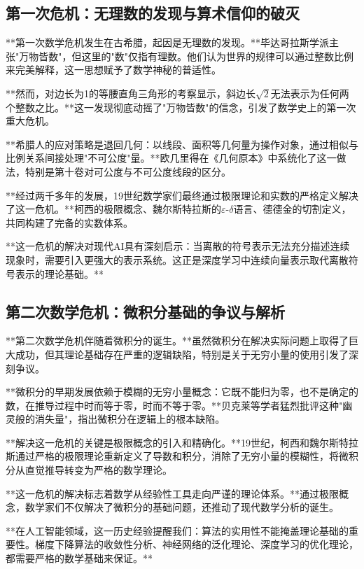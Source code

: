 \subsection{第一次危机：无理数的发现与算术信仰的破灭}

**第一次数学危机发生在古希腊，起因是无理数的发现。**毕达哥拉斯学派主张"万物皆数"，但这里的"数"仅指有理数。他们认为世界的规律可以通过整数比例来完美解释，这一思想赋予了数学神秘的普适性。

**然而，对边长为1的等腰直角三角形的考察显示，斜边长$\sqrt{2}$无法表示为任何两个整数之比。**这一发现彻底动摇了"万物皆数"的信念，引发了数学史上的第一次重大危机。

**希腊人的应对策略是退回几何：以线段、面积等几何量为操作对象，通过相似与比例关系间接处理"不可公度"量。**欧几里得在《几何原本》中系统化了这一做法，特别是第十卷对可公度与不可公度线段的区分。

**经过两千多年的发展，19世纪数学家们最终通过极限理论和实数的严格定义解决了这一危机。**柯西的极限概念、魏尔斯特拉斯的$\varepsilon$-$\delta$语言、德德金的切割定义，共同构建了完备的实数体系。

**这一危机的解决对现代AI具有深刻启示：当离散的符号表示无法充分描述连续现象时，需要引入更强大的表示系统。这正是深度学习中连续向量表示取代离散符号表示的理论基础。**

\subsection{第二次数学危机：微积分基础的争议与解析}

**第二次数学危机伴随着微积分的诞生。**虽然微积分在解决实际问题上取得了巨大成功，但其理论基础存在严重的逻辑缺陷，特别是关于无穷小量的使用引发了深刻争议。

**微积分的早期发展依赖于模糊的无穷小量概念：它既不能归为零，也不是确定的数，在推导过程中时而等于零，时而不等于零。**贝克莱等学者猛烈批评这种"幽灵般的消失量"，指出微积分在逻辑上的根本缺陷。

**解决这一危机的关键是极限概念的引入和精确化。**19世纪，柯西和魏尔斯特拉斯通过严格的极限理论重新定义了导数和积分，消除了无穷小量的模糊性，将微积分从直觉推导转变为严格的数学理论。

**这一危机的解决标志着数学从经验性工具走向严谨的理论体系。**通过极限概念，数学家们不仅解决了微积分的基础问题，还推动了现代数学分析的诞生。

**在人工智能领域，这一历史经验提醒我们：算法的实用性不能掩盖理论基础的重要性。梯度下降算法的收敛性分析、神经网络的泛化理论、深度学习的优化理论，都需要严格的数学基础来保证。**


